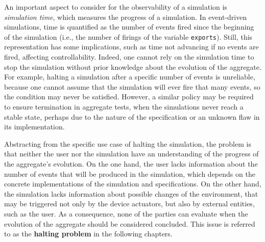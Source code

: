 An important aspect to consider for the observability of a simulation is
\textit{simulation time}, which measures the progress of a simulation. In
event-driven simulations, time is quantified as the number of events fired
since the beginning of the simulation (i.e., the number of firings of the
variable \texttt{exports}). Still, this representation has some implications,
such as time not advancing if no events are fired, affecting controllability.
Indeed, one cannot rely on the simulation time to stop the simulation without
prior knowledge about the evolution of the aggregate. For example, halting a
simulation after a specific number of events is unreliable, because one cannot
assume that the simulation will ever fire that many events, so the condition
may never be satisfied. However, a similar policy may be required to ensure
termination in aggregate tests, when the simulations never reach a stable
state, perhaps due to the nature of the specification or an unknown flaw in its
implementation.

Abstracting from the specific use case of halting the simulation, the problem
is that neither the user nor the simulation have an understanding of the
progress of the aggregate's evolution. On the one hand, the user lacks
information about the number of events that will be produced in the simulation,
which depends on the concrete implementations of the simulation and
specifications. On the other hand, the simulation lacks information about
possible changes of the environment, that may be triggered not only by the
device actuators, but also by external entities, such as the user. As a
consequence, none of the parties can evaluate when the evolution of the
aggregate should be considered concluded. This issue is referred to as the
\textbf{halting problem} in the following chapters.
